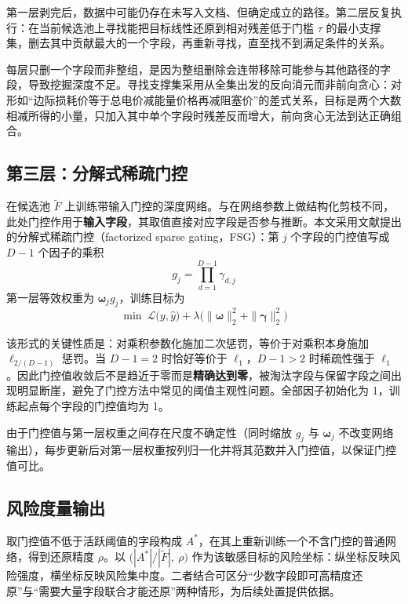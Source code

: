 \documentclass[UTF8,zihao=5,twoside]{ctexart}
\begin{document}
第一层剥完后，数据中可能仍存在未写入文档、但确定成立的路径。第二层反复执行：在当前候选池上寻找能把目标线性还原到相对残差低于门槛 $\tau$ 的最小支撑集，删去其中贡献最大的一个字段，再重新寻找，直至找不到满足条件的关系。

每层只删一个字段而非整组，是因为整组删除会连带移除可能参与其他路径的字段，导致挖掘深度不足。寻找支撑集采用从全集出发的反向消元而非前向贪心：对形如“边际损耗价等于总电价减能量价格再减阻塞价”的差式关系，目标是两个大数相减所得的小量，只加入其中单个字段时残差反而增大，前向贪心无法到达正确组合。

\subsection{第三层：分解式稀疏门控}

在候选池 $\tilde F$ 上训练带输入门控的深度网络。与在网络参数上做结构化剪枝不同，此处门控作用于\textbf{输入字段}，其取值直接对应字段是否参与推断。本文采用文献\cite{ref-dgating}提出的分解式稀疏门控（factorized sparse gating，FSG）：第 $j$ 个字段的门控值写成 $D-1$ 个因子的乘积
\begin{equation}
g_j=\prod_{d=1}^{D-1}\gamma_{d,j}
\end{equation}
第一层等效权重为 $\bm{\omega}_j g_j$，训练目标为
\begin{equation}
\min\ \mathcal{L}\big(y,\hat y\big)+\lambda\Big(\|\bm{\omega}\|_2^2+\|\bm{\gamma}\|_2^2\Big)
\end{equation}

该形式的关键性质是：对乘积参数化施加二次惩罚，等价于对乘积本身施加 $\ell_{2/(D-1)}$ 惩罚。当 $D-1=2$ 时恰好等价于 $\ell_1$，$D-1>2$ 时稀疏性强于 $\ell_1$。因此门控值收敛后不是趋近于零而是\textbf{精确达到零}，被淘汰字段与保留字段之间出现明显断崖，避免了门控方法中常见的阈值主观性问题。全部因子初始化为 1，训练起点每个字段的门控值均为 1。

由于门控值与第一层权重之间存在尺度不确定性（同时缩放 $g_j$ 与 $\bm{\omega}_j$ 不改变网络输出），每步更新后对第一层权重按列归一化并将其范数并入门控值，以保证门控值可比。

\subsection{风险度量输出}

取门控值不低于活跃阈值的字段构成 $A^{\ast}$，在其上重新训练一个不含门控的普通网络，得到还原精度 $\rho$。以 $\big(|A^{\ast}|/|\tilde F|,\ \rho\big)$ 作为该敏感目标的风险坐标：纵坐标反映风险强度，横坐标反映风险集中度。二者结合可区分“少数字段即可高精度还原”与“需要大量字段联合才能还原”两种情形，为后续处置提供依据。
\end{document}
